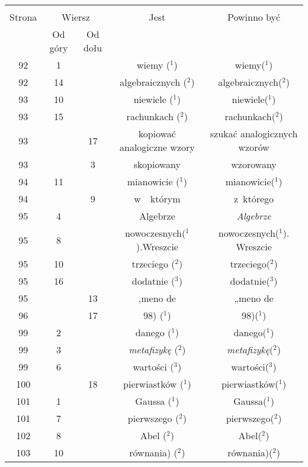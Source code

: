 \documentclass[a4paper,11pt]{article}
\begin{document}
\begin{center}
  \begin{tabular}{|c|c|c|c|c|}
    \hline
    & \multicolumn{2}{c|}{} & & \\
    Strona & \multicolumn{2}{c|}{Wiersz} & Jest
                              & Powinno być \\ \cline{2-3}
    & Od góry & Od dołu & & \\
    \hline
    92  &  1 & & wiemy ($^{ 1 }$) & wiemy($^{ 1 }$) \\
    92  & 14 & & algebraicznych ($^{ 2 }$) & algebraicznych($^{ 2 }$) \\
    93  & 10 & & niewiele ($^{ 1 }$) & niewiele($^{ 1 }$) \\
    93  & 15 & & rachunkach ($^{ 2 }$) & rachunkach($^{ 2 }$) \\
    93  & & 17 & kopiować analogiczne wzory & szukać analogicznych
                                              wzorów \\
    93  & &  3 & skopiowany & wzorowany \\
    94  & 11 & & mianowicie ($^{ 1 }$) & mianowicie($^{ 1 }$) \\
    94  & &  9 & w~~którym & z~którego \\
    95  &  4 & & Algebrze & \emph{Algebrze} \\
    95  &  8 & & nowoczesnych($^{ 1 }$).Wreszcie
           & nowoczesnych($^{ 1 }$). Wreszcie \\
    95  & 10 & & trzeciego ($^{ 2 }$) & trzeciego($^{ 2 }$) \\
    95  & 16 & & dodatnie ($^{ 3 }$) & dodatnie($^{ 3 }$) \\
    95  & & 13 & ,meno de & „meno de \\
    96  & & 17 & 98) ($^{ 1 }$) & 98)($^{ 1 }$) \\
    99  &  2 & & danego ($^{ 1 }$) & danego($^{ 1 }$) \\
    99  &  3 & & \emph{metafizykę} ($^{ 2 }$) & \emph{metafizykę}($^{ 2 }$) \\
    99  &  6 & & wartości ($^{ 3 }$) & wartości($^{ 3 }$) \\
    100 & & 18 & pierwiastków ($^{ 1 }$) & pierwiastków($^{ 1 }$) \\
    101 &  1 & & Gaussa ($^{ 1 }$) & Gaussa($^{ 1 }$) \\
    101 &  7 & & pierwszego ($^{ 2 }$) & pierwszego($^{ 2 }$) \\
    102 &  8 & & Abel ($^{ 2 }$) & Abel($^{ 2 }$) \\
    103 & 10 & & równania) ($^{ 2 }$) & równania)($^{ 2 }$) \\

\end{tabular}
\end{center}
\end{document}
